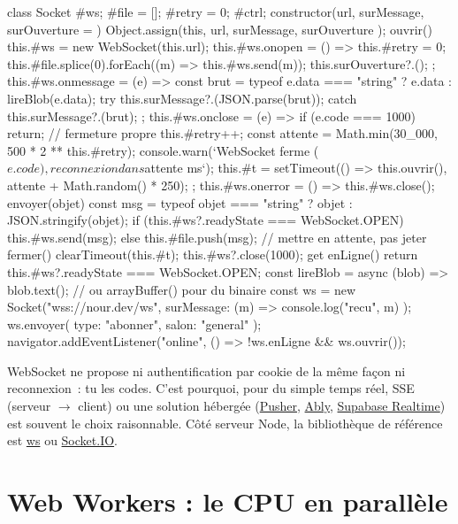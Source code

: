 \documentclass[12pt,a4paper,twoside,openright]{book}
\newcommand{\link}[2]{\href{#2}{#1}}
\begin{document}
\begin{codejs}
class Socket {
  #ws; #file = []; #retry = 0; #ctrl;
  constructor(url, { surMessage, surOuverture } = {}) {
    Object.assign(this, { url, surMessage, surOuverture });
  }
  ouvrir() {
    this.#ws = new WebSocket(this.url);
    this.#ws.onopen = () => {
      this.#retry = 0;
      this.#file.splice(0).forEach((m) => this.#ws.send(m));
      this.surOuverture?.();
    };
    this.#ws.onmessage = (e) => {
      const brut = typeof e.data === "string" ? e.data : lireBlob(e.data);
      try { this.surMessage?.(JSON.parse(brut)); }
      catch { this.surMessage?.(brut); }
    };
    this.#ws.onclose = (e) => {
      if (e.code === 1000) return;                       // fermeture propre
      this.#retry++;
      const attente = Math.min(30_000, 500 * 2 ** this.#retry);
      console.warn(`WebSocket ferme (${e.code}), reconnexion dans ${attente} ms`);
      this.#t = setTimeout(() => this.ouvrir(), attente + Math.random() * 250);
    };
    this.#ws.onerror = () => this.#ws.close();
  }
  envoyer(objet) {
    const msg = typeof objet === "string" ? objet : JSON.stringify(objet);
    if (this.#ws?.readyState === WebSocket.OPEN) this.#ws.send(msg);
    else this.#file.push(msg);                            // mettre en attente, pas jeter
  }
  fermer() { clearTimeout(this.#t); this.#ws?.close(1000); }
  get enLigne() { return this.#ws?.readyState === WebSocket.OPEN; }
}
const lireBlob = async (blob) => blob.text();   // ou arrayBuffer() pour du binaire
const ws = new Socket("wss://nour.dev/ws", { surMessage: (m) => console.log("recu", m) });
ws.envoyer({ type: "abonner", salon: "general" });
navigator.addEventListener("online", () => !ws.enLigne && ws.ouvrir());
\end{codejs}

\begin{note}
WebSocket ne propose ni authentification par cookie de la m\^eme fa\c{c}on ni reconnexion~: tu les
codes. C'est pourquoi, pour du simple temps r\'eel, SSE (serveur $\rightarrow$ client) ou une
solution h\'eberg\'ee (\link{Pusher}{https://pusher.com/}, \link{Ably}{https://www.ably.io/},
\link{Supabase Realtime}{https://supabase.com/}) est souvent le choix raisonnable.
C\^ot\'e serveur Node, la biblioth\`eque de r\'ef\'erence est
\link{ws}{https://github.com/websockets/ws} ou \link{Socket.IO}{https://socket.io/}.
\end{note}

\section{Web Workers : le CPU en parall\`ele}
\label{sec-workers}
\end{document}

